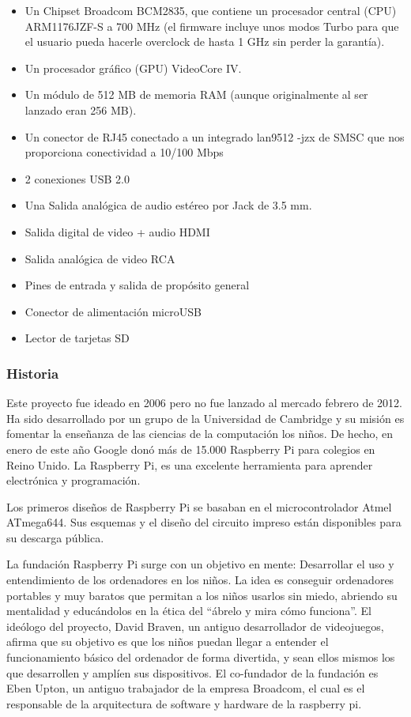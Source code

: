 \documentclass[a4paper,11pt,oneside]{book}
\begin{document}
\begin{itemize}
  \item Un Chipset Broadcom BCM2835, que contiene un procesador central (CPU) ARM1176JZF-S a 700 MHz (el firmware incluye unos modos Turbo para que el usuario pueda hacerle overclock de hasta 1 GHz sin perder la garantía).
  \item Un procesador gráfico (GPU) VideoCore IV.
  \item Un módulo de 512 MB de memoria RAM (aunque originalmente al ser lanzado eran 256 MB).
  \item Un conector de RJ45 conectado a un integrado lan9512 -jzx de SMSC que nos proporciona conectividad a 10/100 Mbps
  \item 2 conexiones USB 2.0
  \item Una Salida analógica de audio estéreo por Jack de 3.5 mm.
  \item Salida digital de video + audio HDMI
  \item Salida analógica de video RCA
  \item Pines de entrada y salida de propósito general
  \item Conector de alimentación microUSB
  \item Lector de tarjetas SD
\end{itemize}


\subsubsection{Historia} 
Este proyecto fue ideado en 2006 pero no fue lanzado al mercado febrero de 2012. Ha sido desarrollado por un grupo de la Universidad de Cambridge y su misión es fomentar la enseñanza de las ciencias de la computación los niños. De hecho, en enero de este año Google donó más de 15.000 Raspberry Pi para colegios en Reino Unido. La Raspberry Pi, es una excelente herramienta para aprender electrónica y programación.

Los primeros diseños de Raspberry Pi se basaban en el microcontrolador Atmel ATmega644. Sus esquemas y el diseño del circuito impreso están disponibles para su descarga pública.

La fundación Raspberry Pi surge con un objetivo en mente: Desarrollar el uso y entendimiento de los ordenadores en los niños. La idea es conseguir ordenadores portables y muy baratos que permitan a los niños usarlos sin miedo, abriendo su mentalidad y educándolos en la ética del ``ábrelo y mira cómo funciona''. El ideólogo del proyecto, David Braven, un antiguo desarrollador de videojuegos, afirma que su objetivo es que los niños puedan llegar a entender el funcionamiento básico del ordenador de forma divertida, y sean ellos mismos los que desarrollen y amplíen sus dispositivos. El co-fundador de la fundación es Eben Upton, un antiguo trabajador de la empresa Broadcom, el cual es el responsable de la arquitectura de software y hardware de la raspberry pi.
\end{document}
